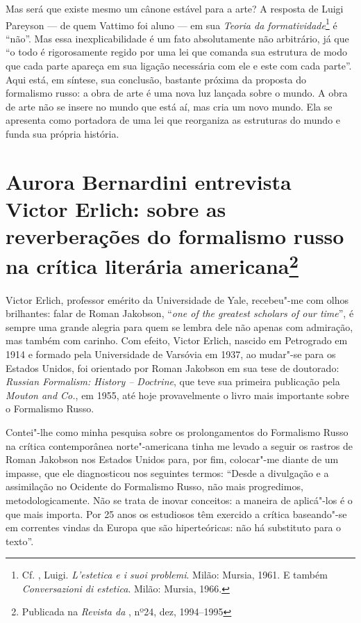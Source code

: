 {{{Mas será que existe mesmo um cânone estável para a arte? A resposta de
Luigi Pareyson --- de quem Vattimo foi aluno
 --- em sua \emph{Teoria da formatividade}\footnote{Cf. , Luigi. 
\emph{L'estetica e i suoi problemi}. Milão: Mursia,
 1961. E também \emph{Conversazioni di estetica}. Milão: Mursia, 1966.}
 é ``não''. Mas essa inexplicabilidade é
um fato absolutamente não arbitrário, já que ``o todo é rigorosamente
regido por uma lei que comanda sua estrutura de modo que cada parte
apareça em sua ligação necessária com ele e este com cada parte''. Aqui
está, em síntese, sua conclusão, bastante próxima da proposta do
formalismo russo: a obra de arte é uma nova luz lançada sobre o mundo. A
obra de arte não se insere no mundo que está aí, mas cria um novo mundo.
Ela se apresenta como portadora de uma lei que reorganiza as estruturas
do mundo e funda sua própria história.

\chapter*{Aurora Bernardini entrevista Victor Erlich: sobre as reverberações do formalismo russo na crítica literária americana\footnote{Publicada na \emph{Revista da }, nº24, dez\jan, 1994--1995}}


Victor Erlich, professor emérito da Universidade de Yale, recebeu"-me com
olhos brilhantes: falar de Roman Jakobson, ``\emph{one of the greatest
scholars of our time}'', é sempre uma grande alegria para quem se lembra
dele não apenas com admiração, mas também com carinho.
Com efeito, Victor Erlich, nascido em Petrogrado em 1914 e formado pela
Universidade de Varsóvia em 1937, ao mudar"-se para os Estados Unidos, foi
orientado por Roman Jakobson em sua tese de doutorado: \emph{Russian
Formalism: History -- Doctrine}, que teve sua primeira publicação
pela \emph{Mouton and Co.}, em 1955, até hoje provavelmente o livro
mais importante sobre o Formalismo Russo.

Contei"-lhe como minha pesquisa sobre os prolongamentos do Formalismo
Russo na crítica contemporânea norte"-americana tinha me levado
 a seguir os rastros de Roman Jakobson nos Estados Unidos para,
por fim, colocar"-me diante de um impasse, que ele diagnosticou nos seguintes
termos: ``Desde a divulgação e a assimilação no Ocidente do Formalismo
Russo, não mais progredimos, metodologicamente. Não se trata de inovar
conceitos: a maneira de aplicá"-los é o que mais importa. Por 25 anos os
estudiosos têm exercido a crítica baseando"-se em correntes vindas da
Europa que são hiperteóricas: não há substituto para o texto''.

}}}
